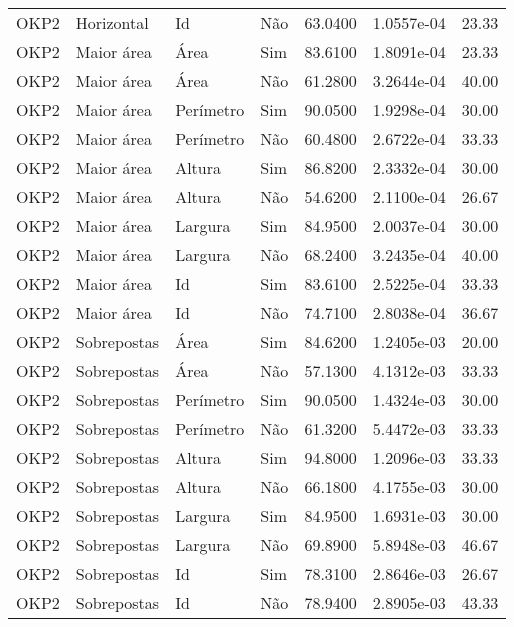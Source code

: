 \begin{tabular}{llllrrr}
OKP2      & Horizontal  & Id        & Não         & 63.0400      & 1.0557e-04 & 23.33    \\
OKP2      & Maior área  & Área      & Sim         & 83.6100      & 1.8091e-04 & 23.33    \\
OKP2      & Maior área  & Área      & Não         & 61.2800      & 3.2644e-04 & 40.00    \\
OKP2      & Maior área  & Perímetro & Sim         & 90.0500      & 1.9298e-04 & 30.00    \\
OKP2      & Maior área  & Perímetro & Não         & 60.4800      & 2.6722e-04 & 33.33    \\
OKP2      & Maior área  & Altura    & Sim         & 86.8200      & 2.3332e-04 & 30.00    \\
OKP2      & Maior área  & Altura    & Não         & 54.6200      & 2.1100e-04 & 26.67    \\
OKP2      & Maior área  & Largura   & Sim         & 84.9500      & 2.0037e-04 & 30.00    \\
OKP2      & Maior área  & Largura   & Não         & 68.2400      & 3.2435e-04 & 40.00    \\
OKP2      & Maior área  & Id        & Sim         & 83.6100      & 2.5225e-04 & 33.33    \\
OKP2      & Maior área  & Id        & Não         & 74.7100      & 2.8038e-04 & 36.67    \\
OKP2      & Sobrepostas & Área      & Sim         & 84.6200      & 1.2405e-03 & 20.00    \\
OKP2      & Sobrepostas & Área      & Não         & 57.1300      & 4.1312e-03 & 33.33    \\
OKP2      & Sobrepostas & Perímetro & Sim         & 90.0500      & 1.4324e-03 & 30.00    \\
OKP2      & Sobrepostas & Perímetro & Não         & 61.3200      & 5.4472e-03 & 33.33    \\
OKP2      & Sobrepostas & Altura    & Sim         & 94.8000      & 1.2096e-03 & 33.33    \\
OKP2      & Sobrepostas & Altura    & Não         & 66.1800      & 4.1755e-03 & 30.00    \\
OKP2      & Sobrepostas & Largura   & Sim         & 84.9500      & 1.6931e-03 & 30.00    \\
OKP2      & Sobrepostas & Largura   & Não         & 69.8900      & 5.8948e-03 & 46.67    \\
OKP2      & Sobrepostas & Id        & Sim         & 78.3100      & 2.8646e-03 & 26.67    \\
OKP2      & Sobrepostas & Id        & Não         & 78.9400      & 2.8905e-03 & 43.33    \\
\hline
\end{tabular}